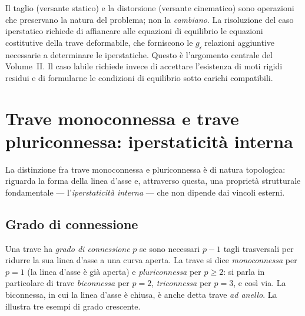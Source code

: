 \begin{oss}
	Il taglio (versante statico) e la distorsione
	(versante cinematico) sono operazioni che
	preservano la natura del problema; non la
	\emph{cambiano}. La risoluzione del caso
	iperstatico richiede di affiancare alle
	equazioni di equilibrio le equazioni
	costitutive della trave deformabile, che
	forniscono le $g_{\mathscr{i}}$ relazioni
	aggiuntive necessarie a determinare le
	iperstatiche. Questo è l'argomento centrale
	del Volume~II. Il caso labile richiede invece
	di accettare l'esistenza di moti rigidi residui
	e di formularne le condizioni di equilibrio
	sotto carichi compatibili.
\end{oss}



\section{Trave monoconnessa e trave pluriconnessa: iperstaticità interna}
\label{sec:connessione}

La distinzione fra trave monoconnessa e pluriconnessa
è di natura topologica: riguarda la forma della linea
d'asse e, attraverso questa, una proprietà strutturale
fondamentale --- l'\emph{iperstaticità interna} ---
che non dipende dai vincoli esterni.

\subsection{Grado di connessione}
\label{sec:grado_connessione}


Una trave ha \emph{grado di connessione} $p$ se
sono necessari $p-1$ tagli trasversali per ridurre
la sua linea d'asse a una curva aperta. La trave
si dice \emph{monoconnessa} per $p = 1$ (la linea
d'asse è già aperta) e \emph{pluriconnessa} per
$p \geq 2$: si parla in particolare di trave
\emph{biconnessa} per $p = 2$, \emph{triconnessa}
per $p = 3$, e così via. La biconnessa, in cui la
linea d'asse è chiusa, è anche detta trave
\emph{ad anello}. La  illustra tre esempi
di grado crescente.



